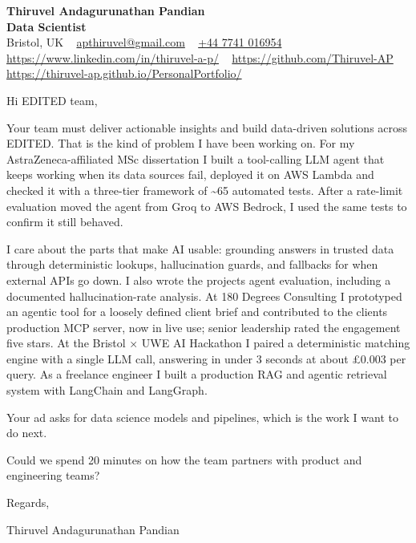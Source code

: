 \documentclass[11pt,a4paper]{article}
\begin{document}
\raggedright
\pagestyle{empty}

\begin{center}
    {\LARGE \color{linkblue} \textbf{Thiruvel Andagurunathan Pandian}}\\[0.2cm]
    {\color{headernavy}\small\textbf{Data Scientist}}\\[0.2cm]
    {\small Bristol, UK\nobreak\ \,\textbar\, \href{mailto:apthiruvel@gmail.com}{apthiruvel@gmail.com}\nobreak\ \,\textbar\, \href{tel:+447741016954}{+44 7741 016954}\nobreak\ \,\textbar\, \href{https://www.linkedin.com/in/thiruvel-a-p/}{https://www.linkedin.com/in/thiruvel-a-p/}\nobreak\ \,\textbar\, \href{https://github.com/Thiruvel-AP}{https://github.com/Thiruvel-AP}\nobreak\ \,\textbar\, \href{https://thiruvel-ap.github.io/PersonalPortfolio/}{https://thiruvel-ap.github.io/PersonalPortfolio/}}

\end{center}

\vspace{0.4cm}

\noindent
Hi EDITED team,

Your team must deliver actionable insights and build data-driven solutions across EDITED. That is the kind of problem I have been working on. For my AstraZeneca-affiliated MSc dissertation I built a tool-calling LLM agent that keeps working when its data sources fail, deployed it on AWS Lambda and checked it with a three-tier framework of \textasciitilde{}65 automated tests. After a rate-limit evaluation moved the agent from Groq to AWS Bedrock, I used the same tests to confirm it still behaved.

I care about the parts that make AI usable: grounding answers in trusted data through deterministic lookups, hallucination guards, and fallbacks for when external APIs go down. I also wrote the project\textquotesingle{}s agent evaluation, including a documented hallucination-rate analysis. At 180 Degrees Consulting I prototyped an agentic tool for a loosely defined client brief and contributed to the client\textquotesingle{}s production MCP server, now in live use; senior leadership rated the engagement five stars. At the Bristol × UWE AI Hackathon I paired a deterministic matching engine with a single LLM call, answering in under 3 seconds at about £0.003 per query. As a freelance engineer I built a production RAG and agentic retrieval system with LangChain and LangGraph.

Your ad asks for data science models and pipelines, which is the work I want to do next.

Could we spend 20 minutes on how the team partners with product and engineering teams?

\vspace{0.5cm}

Regards,

Thiruvel Andagurunathan Pandian
\end{document}
